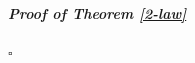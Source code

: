 \documentclass[10pt]{amsart}
\numberwithin{equation}{section}
\theoremstyle{plain}
\numberwithin{equation}{section}
\theoremstyle{definition}
\theoremstyle{remark}
\newenvironment{myproof}[2] {\paragraph{\emph{Proof of {#1} {#2} }}}{\hfill$\square$}
\def\ac{\mathrm{ac}}
\def\ur{\mathrm{ur}}
\def\ac{\mathrm{ac}}
\def\triplef{\underline{\mathbf{f}}}
\def\calO{\mathcal{O}}
\def\frakp{\mathfrak{p}}
\def\FF{\mathbf{F}}
\def\rmH{\mathrm{H}}
\def\rmM{\mathrm{M}}
\def\rmX{\mathrm{X}}
\def\rmXbar{\overline{\rmX}}
\newcommand{\Gr}{\mathbf{Gr}}
\begin{document}
\begin{myproof}{Theorem \ref{2-law}}{}

\end{myproof}
\end{document}
